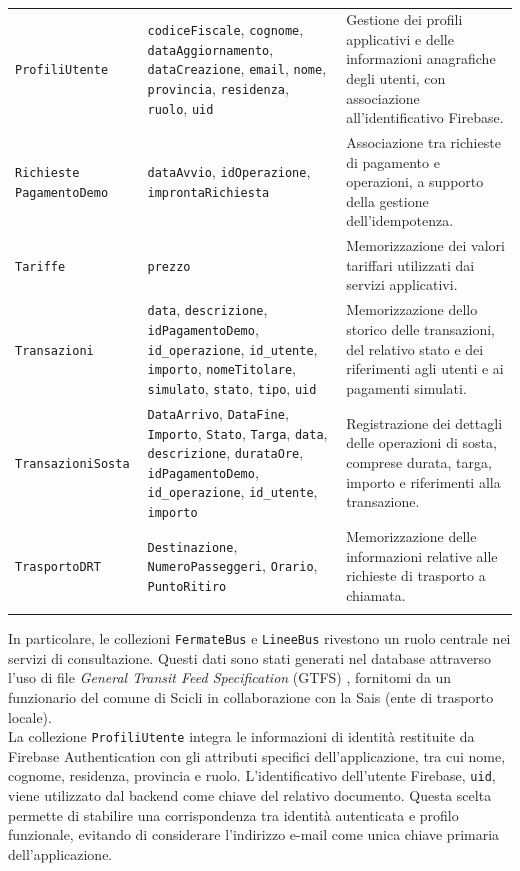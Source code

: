 \begin{longtable}{P{3cm}P{6.1cm}P{5.5cm}}
\texttt{ProfiliUtente} &
\texttt{codiceFiscale}, \texttt{cognome},
\texttt{dataAggiornamento},
\texttt{dataCreazione}, \texttt{email},
\texttt{nome}, \texttt{provincia},
\texttt{residenza}, \texttt{ruolo},
\texttt{uid} &
Gestione dei profili applicativi e delle
informazioni anagrafiche degli utenti,
con associazione all'identificativo Firebase.\\

\texttt{Richieste}\newline
\texttt{PagamentoDemo} &
\texttt{dataAvvio}, \texttt{idOperazione},
\texttt{improntaRichiesta} &
Associazione tra richieste di pagamento
e operazioni, a supporto della gestione
dell'idempotenza.\\

\texttt{Tariffe} &
\texttt{prezzo} &
Memorizzazione dei valori tariffari
utilizzati dai servizi applicativi.\\

\texttt{Transazioni} &
\texttt{data}, \texttt{descrizione},
\texttt{idPagamentoDemo},
\texttt{id\_operazione}, \texttt{id\_utente},
\texttt{importo}, \texttt{nomeTitolare},
\texttt{simulato}, \texttt{stato},
\texttt{tipo}, \texttt{uid} &
Memorizzazione dello storico delle transazioni,
del relativo stato e dei riferimenti
agli utenti e ai pagamenti simulati.\\

\texttt{TransazioniSosta} &
\texttt{DataArrivo}, \texttt{DataFine},
\texttt{Importo}, \texttt{Stato},
\texttt{Targa}, \texttt{data},
\texttt{descrizione}, \texttt{durataOre},
\texttt{idPagamentoDemo},
\texttt{id\_operazione}, \texttt{id\_utente},
\texttt{importo} &
Registrazione dei dettagli delle operazioni
di sosta, comprese durata, targa,
importo e riferimenti alla transazione.\\

\texttt{TrasportoDRT} &
\texttt{Destinazione},
\texttt{NumeroPasseggeri},
\texttt{Orario}, \texttt{PuntoRitiro} &
Memorizzazione delle informazioni relative
alle richieste di trasporto a chiamata.\\
\bottomrule
\caption{}
\end{longtable}
\noindent
In particolare, le collezioni \texttt{FermateBus} e \texttt{LineeBus} rivestono un ruolo centrale nei servizi di consultazione. Questi dati sono stati generati nel database attraverso l'uso di file \emph{General Transit Feed Specification} (GTFS) \cite{gtfs}, fornitomi da un funzionario del comune di Scicli in collaborazione con la Sais (ente di trasporto locale). 
\\
La collezione \texttt{ProfiliUtente} integra le informazioni di identità restituite da Firebase Authentication con gli attributi specifici dell'applicazione, tra cui nome, cognome, residenza, provincia e ruolo. L'identificativo dell'utente Firebase, \texttt{uid}, viene utilizzato dal backend come chiave del relativo documento. Questa scelta permette di stabilire una corrispondenza tra identità autenticata e profilo funzionale, evitando di considerare l'indirizzo e-mail come unica chiave primaria dell'applicazione.

